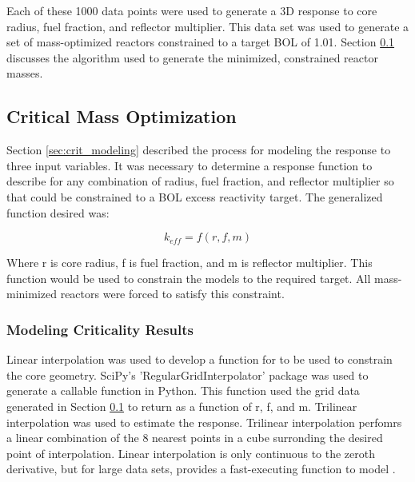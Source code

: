 Each of these 1000 data points were used to generate a 3D \keff response to
core radius, fuel fraction, and reflector multiplier. This data set was used to
generate a set of mass-optimized reactors constrained to a target BOL \keff of
1.01. Section \ref{sec:crit_rad_search} discusses the algorithm used to generate
the minimized, constrained reactor masses.

\subsection{Critical Mass Optimization}\label{sec:crit_rad_search}
Section \ref{sec:crit_modeling} described the process for modeling the \keff
response to three input variables. It was necessary to determine a response
function to describe \keff for any combination of radius, fuel fraction, and
reflector multiplier so that \keff could be constrained to a BOL excess
reactivity target. The generalized function desired was:

\begin{equation}
    k_{eff} = f(r, f, m)
\label{eq:gen_keff}
\end{equation}

Where r is core radius, f is fuel fraction, and m is reflector multiplier. This
function would be used to constrain the models to the required \keff target. All
mass-minimized reactors were forced to satisfy this constraint.

\subsubsection{Modeling Criticality Results}
Linear interpolation was used to develop a function for \keff to be used to
constrain the core geometry. SciPy's 'RegularGridInterpolator' package was used
to generate a callable function in Python. This function used the grid data
generated in Section \ref{sec:crit_rad_search} to return \keff as a function of
r, f, and m. Trilinear interpolation was used to estimate the \keff response.
Trilinear interpolation perfomrs a linear combination of the 8 nearest points in
a cube surronding the desired point of interpolation. Linear interpolation is
only continuous to the zeroth derivative, but for large data sets, provides a
fast-executing function to model \keff.


